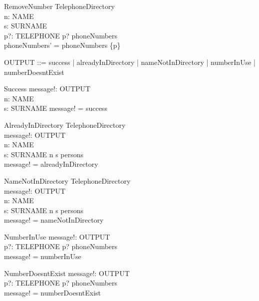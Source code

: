 \documentclass{article}
\begin{document}
\begin{schema}{RemoveNumber}
\Delta TelephoneDirectory \\
n: NAME \\
s: SURNAME \\
p?: TELEPHONE
\where
p? \in \ran phoneNumbers \\
\ran phoneNumbers' = \ran phoneNumbers \setminus \{p\}\\
\end{schema}

\begin{zed}
OUTPUT ::= success | alreadyInDirectory | nameNotInDirectory | numberInUse | numberDoesntExist
\end{zed}

\begin{schema}{Success}
message!: OUTPUT \\
n: NAME \\
s: SURNAME
\where
message! = success
\end{schema}

\begin{schema}{AlreadyInDirectory}
\Xi TelephoneDirectory \\
message!: OUTPUT \\
n: NAME \\
s: SURNAME
\where
n \mapsto s \in persons \\
message! = alreadyInDirectory
\end{schema}

\begin{schema}{NameNotInDirectory}
\Xi TelephoneDirectory \\
message!: OUTPUT \\
n: NAME \\
s: SURNAME
\where
n \mapsto s \notin persons \\
message! = nameNotInDirectory
\end{schema}

\begin{schema}{NumberInUse}
message!: OUTPUT \\
p?: TELEPHONE
\where
p? \in  \ran phoneNumbers \\
message! = numberInUse
\end{schema}

\begin{schema}{NumberDoesntExist}
message!: OUTPUT \\
p?: TELEPHONE
\where
p? \notin \ran phoneNumbers \\
message! = numberDoesntExist
\end{schema}
\end{document}
